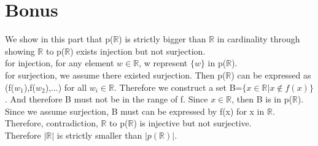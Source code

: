 \documentclass[12pt]{article}
\theoremstyle{definition}
\numberwithin{equation}{subsection}
\begin{document}
\section{Bonus}
We show in this part that p($\mathbb{R}$) is strictly bigger than $\mathbb{R}$ in cardinality through showing $\mathbb{R}$ to p($\mathbb{R}$) exists injection but not surjection.
\\for injection, for any element $w\in \mathbb{R} $, w represent $\{w\}$ in p($\mathbb{R}$).
\\for surjection, we assume there existed surjection. Then p($\mathbb{R}$) can be expressed as (f($w_1$),f($w_2$),...) for all $w_i \in \mathbb{R}$. Therefore we construct a set B=$\{x\in \mathbb{R} | x\notin f(x) \}$. And therefore B must not be in the range of f. 
Since $x\in \mathbb{R}$, then B is in p($\mathbb{R}$). Since we assume surjection, B must can be expressed by f(x) for x in $\mathbb{R}$. 
\\Therefore, contradiction, $\mathbb{R}$ to p($\mathbb{R}$) is injective but not surjective. 
\\ Therefore $|\mathbb{R}|$ is strictly smaller than $|p(\mathbb{R})|$.
\end{document}
